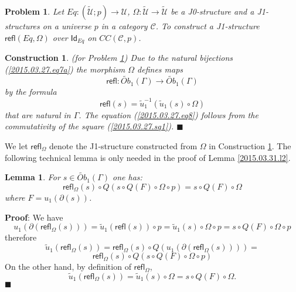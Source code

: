 \documentclass[12pt]{article}
\numberwithin{equation}{section}
\newenvironment{myproof}{{\bf Proof}:}{$\blacksquare$ \vskip 5mm }
\newtheorem{lemma}[proposition]{Lemma}
\newtheorem{problem}[proposition]{Problem}
\newtheorem{construction0}[proposition]{Construction}
\newenvironment{construction}[1]{\begin{construction0}(for Problem \ref{#1})}{$\blacksquare$ \end{construction0}}
\newcommand{\llabel}[1]{\label{#1}}
\newcommand{\sr}{\rightarrow}
\newcommand{\wt}{\widetilde}
\newcommand{\toCC}{CC} %
\newcommand{\Id}{\mathsf{Id}} %
\newcommand{\refl}{\mathsf{refl}}
\newcommand{\U}{\mathcal{U}}
\begin{document}
%
\begin{problem}
\llabel{2015.03.27.prob4} Let $Eq:(\wt{\U};p)\sr \U$, $\Omega:\wt{\U}\sr \wt{\U}$
be a J0-structure and a J1-structures on a universe $p$ in a category $\mathcal
C$. To construct a J1-structure $\refl(Eq,\Omega)$ over $\Id_{Eq}$ on
$\toCC({\mathcal C},p)$.
\end{problem}
%
\begin{construction}{2015.03.27.prob4}\rm
\llabel{2015.03.27.constr4} Due to the natural bijections
(\ref{2015.03.27.eq7a}) the morphism $\Omega$ defines maps
%
$$\refl:\wt{Ob}_1(\Gamma)\sr \wt{Ob}_1(\Gamma)$$
%
by the formula
%
$$\refl(s)=\wt{u}_1^{-1}(\wt{u}_1(s)\circ \Omega)$$
%
that are natural in $\Gamma$. The equation (\ref{2015.03.27.eq8}) follows from
the commutativity of the square (\ref{2015.03.27.sq1}).
\end{construction}
%
We let $\refl_{\Omega}$ denote the J1-structure constructed from $\Omega$ in
Construction \ref{2015.03.27.constr4}.
%
The following technical lemma is only needed in the proof of Lemma
\ref{2015.03.31.l2}.
%
\begin{lemma}
\llabel{2015.04.02.l3} For $s\in \wt{Ob}_1(\Gamma)$ one has:
%
$$\refl_{\Omega}(s)\circ Q(s\circ Q(F)\circ \Omega\circ p)=s\circ Q(F)\circ
\Omega$$
%
where $F=u_1(\partial(s))$.
\end{lemma}
%
\begin{myproof}
We have
%
$$u_1(\partial(\refl_{\Omega}(s)))=\wt{u}_1(\refl(s))\circ p=\wt{u}_1(s)\circ
\Omega\circ p=s\circ Q(F)\circ \Omega\circ p$$
%
therefore
%
$$\wt{u}_1(\refl_{\Omega}(s))=\refl_{\Omega}(s)\circ
Q(u_1(\partial(\refl_{\Omega}(s))))=$$
$$\refl_{\Omega}(s)\circ Q(s\circ Q(F)\circ \Omega\circ p)$$
%
On the other hand, by definition of $\refl_{\Omega}$,
%
$$\wt{u}_1(\refl_{\Omega}(s))=\wt{u}_1(s)\circ \Omega=s\circ Q(F)\circ \Omega.$$
%
\end{myproof}
\end{document}

